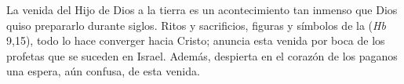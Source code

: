 	
	 La venida del Hijo de Dios a la tierra es un acontecimiento tan inmenso que Dios quiso prepararlo durante siglos. Ritos y sacrificios, figuras y símbolos de la  (\emph{Hb} 9,15), todo lo hace converger hacia Cristo; anuncia esta venida por boca de los profetas que se suceden en Israel. Además, despierta en el corazón de los paganos una espera, aún confusa, de esta venida.

